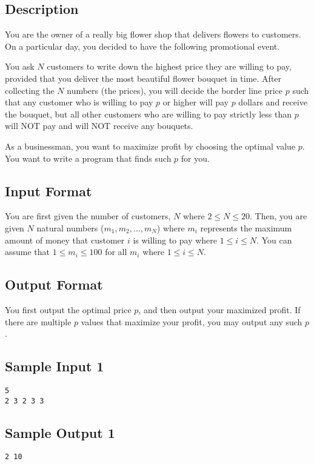 \documentclass[12pt]{article}
\begin{document}
\subsection*{Description}
You are the owner of a really big flower shop that delivers flowers to customers.  On a particular day, you decided to have the following promotional event.  

You ask $N$ customers to write down the highest price they are willing to pay, provided that you deliver the most beautiful flower bouquet in time.  After collecting the $N$ numbers (the prices), you will decide the border line price $p$ such that any customer who is willing to pay $p$ or higher will pay $p$ dollars and receive the bouquet, but all other customers who are willing to pay strictly less than $p$ will NOT pay and will NOT receive any bouquets. 

As a businessman, you want to maximize profit by choosing the optimal value $p$.  You want to write a program that finds such $p$ for you. 

\subsection*{Input Format}
You are first given the number of customers, $N$ where $2 \leq N \leq 20$. Then, you are given $N$ natural numbers ($m_1, m_2, \dots, m_N$) where $m_i$ represents the maximum amount of money that customer $i$ is willing to pay where $1 \leq i \leq N$. You can assume that $1 \leq m_i \leq 100$ for all $m_i$ where $1 \leq i \leq N$. 

\subsection*{Output Format}
You first output the optimal price $p$, and then output your maximized profit. If there are multiple $p$ values that maximize your profit, you may output any such $p$. 

\subsection*{Sample Input 1}
\begin{verbatim}
5
2 3 2 3 3
\end{verbatim}
\subsection*{Sample Output 1}
\begin{verbatim}
2 10
\end{verbatim}
\end{document}
